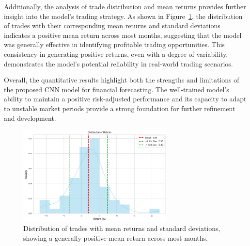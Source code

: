 Additionally, the analysis of trade distribution and mean returns provides further insight into the model's trading strategy. As shown in Figure~\ref{fig:trade_distribution}, the distribution of trades with their corresponding mean returns and standard deviations indicates a positive mean return across most months, suggesting that the model was generally effective in identifying profitable trading opportunities. This consistency in generating positive returns, even with a degree of variability, demonstrates the model’s potential reliability in real-world trading scenarios.

Overall, the quantitative results highlight both the strengths and limitations of the proposed CNN model for financial forecasting. The well-trained model's ability to maintain a positive risk-adjusted performance and its capacity to adapt to unstable market periods provide a strong foundation for further refinement and development.

\begin{figure}[h!]
    \centering
    \includegraphics[width=0.7\textwidth]{chapters/Chap4/Monthly_Distribution.png}
    \caption{Distribution of trades with mean returns and standard deviations, showing a generally positive mean return across most months.}
    \label{fig:trade_distribution}
\end{figure}
